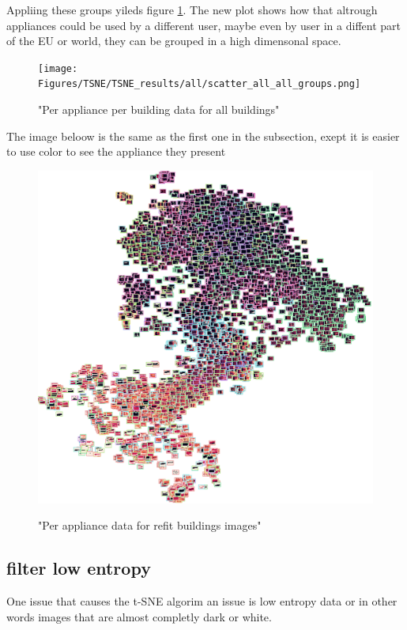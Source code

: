 Appliing these groups yileds figure \ref{fig:tsne_papb_scatter_all_groups}.
The new plot shows how that altrough appliances could be used by a different
user, maybe even by user in a diffent part of the EU or world,
they can be grouped in a high dimensonal space. 
\begin{figure}[H]
	\centering
	\caption{"Per appliance per building data for all buildings"}
	\texttt{[image: Figures/TSNE/TSNE\_results/all/scatter\_all\_all\_groups.png]}
	\label{fig:tsne_papb_scatter_all_groups}
\end{figure}

The image beloow is the same as the first one in the subsection,
exept it is easier to use color to see the appliance they present

\begin{figure}[H]
	\centering
	\caption{"Per appliance data for refit buildings images"}
	\includegraphics[width=.9\textwidth]{Figures/TSNE/TSNE_results/all/img_scatter_all_all_groups.png}
	\label{fig:tsne_papb_img_scatter_all_groups}
\end{figure}

\subsection{filter low entropy}

One issue that causes the t-SNE algorim an issue is low entropy data or 
in other words images that are almost completly dark or white.

